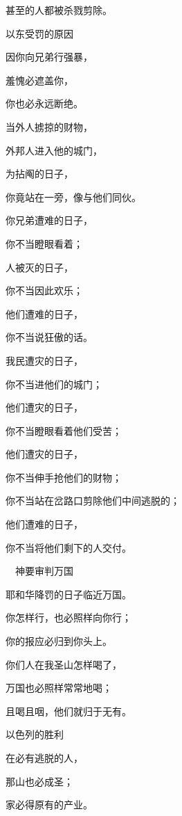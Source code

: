 {\par }{\Q 甚至{}的人都被杀戮剪除。
\par }{\SH 以东受罚的原因
\par }{\Q {}因你向兄弟{}行强暴，
\par }{\Q 羞愧必遮盖你，
\par }{\Q 你也必永远断绝。
\par }{\Q {}当外人掳掠{}的财物，
\par }{\Q 外邦人进入他的城门，
\par }{\Q 为{}拈阄的日子，
\par }{\Q 你竟站在一旁，像与他们同伙。
\par }{\Q {}你兄弟遭难的日子，
\par }{\Q 你不当瞪眼看着；
\par }{人被灭的日子，
\par }{\Q 你不当因此欢乐；
\par }{\Q 他们遭难的日子，
\par }{\Q 你不当说狂傲的话。
\par }{\Q {}我民遭灾的日子，
\par }{\Q 你不当进他们的城门；
\par }{\Q 他们遭灾的日子，
\par }{\Q 你不当瞪眼看着他们受苦；
\par }{\Q 他们遭灾的日子，
\par }{\Q 你不当伸手抢他们的财物；
\par }{\Q {}你不当站在岔路口剪除他们中间逃脱的；
\par }{\Q 他们遭难的日子，
\par }{\Q 你不当将他们剩下的人交付{}。
\par }{\SH 　神要审判万国
\par }{\Q {}耶和华降罚的日子临近万国。
\par }{\Q 你怎样行，{}也必照样向你行；
\par }{\Q 你的报应必归到你头上。
\par }{\Q {}你们{}人在我圣山怎样喝了{}，
\par }{\Q 万国也必照样常常地喝；
\par }{\Q 且喝且咽，他们就归于无有。
\par }{\SH 以色列的胜利
\par }{\Q {}在{}必有逃脱的人，
\par }{\Q 那山也必成圣；
\par }{家必得原有的产业。
}
